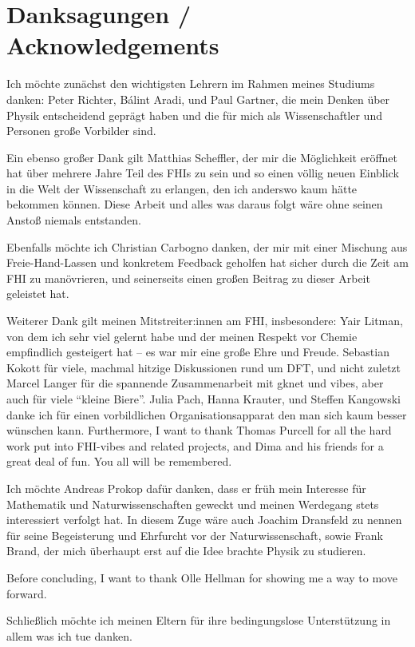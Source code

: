 \chapter{Danksagungen / Acknowledgements}

Ich möchte zunächst den wichtigsten Lehrern im Rahmen meines Studiums danken: Peter Richter, Bálint Aradi, und Paul Gartner, die mein Denken über Physik entscheidend geprägt haben und die für mich als Wissenschaftler und Personen große Vorbilder sind.

Ein ebenso großer Dank gilt Matthias Scheffler, der mir die Möglichkeit eröffnet hat über mehrere Jahre Teil des FHIs zu sein und so einen völlig neuen Einblick in die Welt der Wissenschaft zu erlangen, den ich anderswo kaum hätte bekommen können. Diese Arbeit und alles was daraus folgt wäre ohne seinen Anstoß niemals entstanden.

Ebenfalls möchte ich Christian Carbogno danken, der mir mit einer Mischung aus Freie-Hand-Lassen und konkretem Feedback geholfen hat sicher durch die Zeit am FHI zu manövrieren, und seinerseits einen großen Beitrag zu dieser Arbeit geleistet hat.

Weiterer Dank gilt meinen Mitstreiter:innen am FHI, insbesondere: Yair Litman, von dem ich sehr viel gelernt habe und der meinen Respekt vor Chemie empfindlich gesteigert hat -- es war mir eine große Ehre und Freude. Sebastian Kokott für viele, machmal hitzige Diskussionen rund um DFT, und nicht zuletzt Marcel Langer für die spannende Zusammenarbeit mit gknet und vibes, aber auch für viele ``kleine Biere''. Julia Pach, Hanna Krauter, und Steffen Kangowski danke ich für einen vorbildlichen Organisationsapparat den man sich kaum besser wünschen kann. 
Furthermore, I want to thank Thomas Purcell for all the hard work put into FHI-vibes and related projects, and Dima and his friends for a great deal of fun. You all will be remembered.

Ich möchte Andreas Prokop dafür danken, dass er früh mein Interesse für Mathematik und Naturwissenschaften geweckt und meinen Werdegang stets interessiert verfolgt hat. In diesem Zuge wäre auch Joachim Dransfeld zu nennen für seine Begeisterung und Ehrfurcht vor der Naturwissenschaft, sowie Frank Brand, der mich überhaupt erst auf die Idee brachte Physik zu studieren.

Before concluding, I want to thank Olle Hellman for showing me a way to move forward.

Schließlich möchte ich meinen Eltern für ihre bedingungslose Unterstützung in allem was ich tue danken.
